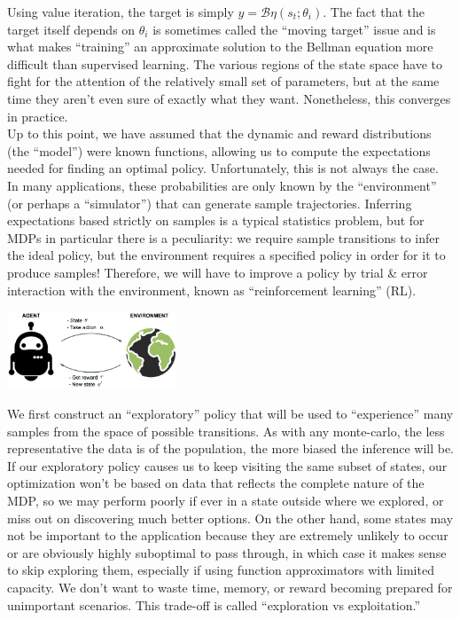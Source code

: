 Using value iteration, the target is simply $y = \mathcal{B}\eta(s_t;\theta_i)$. The fact that the target itself depends on $\theta_i$ is sometimes called the ``moving target'' issue and is what makes ``training'' an approximate solution to the Bellman equation more difficult than supervised learning. The various regions of the state space have to fight for the attention of the relatively small set of parameters, but at the same time they aren't even sure of exactly what they want. Nonetheless, this converges in practice.\\

Up to this point, we have assumed that the dynamic and reward distributions (the ``model'') were known functions, allowing us to compute the expectations needed for finding an optimal policy. Unfortunately, this is not always the case. In many applications, these probabilities are only known by the ``environment'' (or perhaps a ``simulator'') that can generate sample trajectories. Inferring expectations based strictly on samples is a typical statistics problem, but for MDPs in particular there is a peculiarity: we require sample transitions to infer the ideal policy, but the environment requires a specified policy in order for it to produce samples! Therefore, we will have to improve a policy by trial \& error interaction with the environment, known as ``reinforcement learning'' (RL).
\begin{center}
  \includegraphics[width=2in]{include/rl_basic.png}
\end{center}

We first construct an ``exploratory'' policy that will be used to ``experience'' many samples from the space of possible transitions. As with any monte-carlo, the less representative the data is of the population, the more biased the inference will be. If our exploratory policy causes us to keep visiting the same subset of states, our optimization won't be based on data that reflects the complete nature of the MDP, so we may perform poorly if ever in a state outside where we explored, or miss out on discovering much better options. On the other hand, some states may not be important to the application because they are extremely unlikely to occur or are obviously highly suboptimal to pass through, in which case it makes sense to skip exploring them, especially if using function approximators with limited capacity. We don't want to waste time, memory, or reward becoming prepared for unimportant scenarios. This trade-off is called ``exploration vs exploitation.''\\

